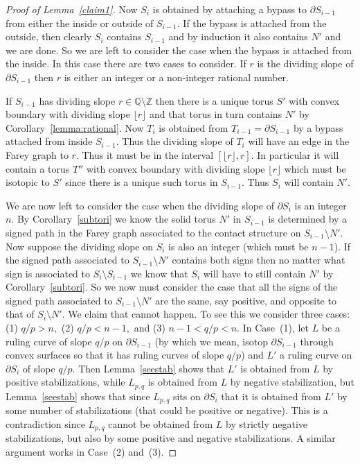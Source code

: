 \documentclass[11pt]{amsart}
\theoremstyle{plain}
\theoremstyle{definition}
\theoremstyle{remark}
\numberwithin{theorem}{section}
\newcommand{\Q}{\mathbb{Q}}           %
\newcommand{\Z}{\mathbb{Z}}           %
\begin{document}
\begin{proof}[Proof of Lemma~\ref{claim1}]
Now $S_i$ is obtained by attaching a bypass to $\partial S_{i-1}$ from either the inside or outside of $S_{i-1}$. If the bypass is attached from the outside, then clearly $S_i$ contains $S_{i-1}$ and by induction it also contains $N'$ and we are done. So we are left to consider the case when the bypass is attached from the inside. In this case there are two cases to consider. If $r$ is the dividing slope of $\partial S_{i-1}$ then $r$ is either an integer or a non-integer rational number. %


If $S_{i-1}$ has dividing slope $r\in \Q\setminus \Z$ then there is a unique torus $S'$ with convex boundary with dividing slope $\lfloor{r}\rfloor$ and that torus in turn contains $N'$ by Corollary~\ref{lemma:rational}. Now $T_i$ is obtained from $T_{i-1}=\partial S_{i-1}$ by a bypass attached from inside $S_{i-1}$. Thus the dividing slope of $T_i$ will have an edge in the Farey graph to $r$. Thus it must be in the interval $[\lfloor{r}\rfloor, r]$. In particular it will contain a torus $T''$ with convex boundary with dividing slope $\lfloor{r}\rfloor$ which must be isotopic to $S'$ since there is a unique such torus in $S_{i-1}$. Thus $S_i$ will contain $N'$. 
	
We are now left to consider the case when the dividing slope of $\partial S_i$ is an integer $n$. By Corollary~\ref{subtori} we know the solid torus $N'$ in $S_{i-1}$ is determined by a signed path in the Farey graph associated to the contact structure on $S_{i-1}\setminus N'$. Now suppose the dividing slope on $S_i$ is also an integer (which must be $n-1$). If the signed path associated to $S_{i-1}\setminus N'$ contains both signs then no matter what sign is associated to $S_i\setminus S_{i-1}$ we know that $S_i$ will have to still contain $N'$ by Corollary~\ref{subtori}. So we now must consider the case that all the signs of the signed path associated to $S_{i-1}\setminus N'$ are the same, say positive, and opposite to that of $S_i\setminus N'$. We claim that cannot happen. To see this we consider three cases: (1) $q/p>n,$ (2) $q/p<n-1,$ and (3) $n-1<q/p<n$.  In Case~(1), let $L$ be a ruling curve of slope $q/p$   on $\partial S_{i-1}$ (by which we mean, isotop $\partial S_{i-1}$ through convex surfaces so that it has ruling curves of slope $q/p$) and $L'$ a ruling curve on $\partial S_i$ of slope $q/p$. Then Lemma~\ref{seestab} shows that $L'$ is obtained from $L$ by positive stabilizations, while $L_{p,q}$ is obtained from $L$ by negative stabilization, but Lemma~\ref{seestab} shows that since $L_{p,q}$ sits on $\partial S_i$ that it is obtained from $L'$ by some number of stabilizations (that could be positive or negative). This is a contradiction since $L_{p,q}$ cannot be obtained from $L$ by strictly negative stabilizations, but also by some positive and negative stabilizations. A similar argument works in Case~(2) and~(3). 
\end{proof}
\end{document}
